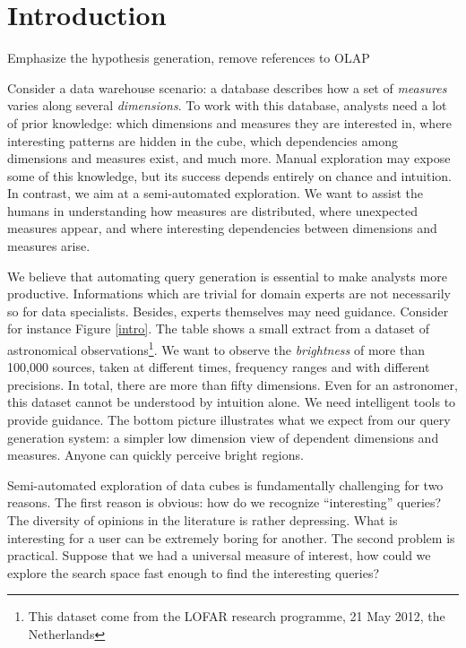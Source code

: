 \section{Introduction}
\label{sec:intro}

{ \color{red}
    Emphasize the hypothesis generation, remove references to OLAP}

Consider a data warehouse scenario: a database describes how a set of
\emph{measures} varies along several \emph{dimensions}. To work with this
database, analysts need a lot of prior knowledge: which dimensions and measures
they are interested in, where interesting patterns are hidden in the cube,
which dependencies among dimensions and measures exist, and much more.  Manual
exploration may expose some of this knowledge, but its success depends entirely
on chance and intuition. In contrast, we aim at a semi-automated exploration.
We want to assist the humans in understanding how measures are distributed,
where unexpected measures appear, and where interesting dependencies between
dimensions and measures arise.

We believe that automating query generation is essential to make analysts more
productive. Informations which are trivial for domain experts are not
necessarily so for data specialists. Besides, experts themselves may need
guidance. Consider for instance Figure \ref{intro}. The table shows a small
extract from a dataset of astronomical observations\footnote{This dataset come
from the LOFAR research programme, 21 May 2012, the Netherlands}. We want to
observe the \emph{brightness} of more than 100,000 sources, taken at different
times, frequency ranges and with different precisions. In total, there are more
than fifty dimensions. Even for an astronomer, this dataset cannot be
understood by intuition alone. We need intelligent tools to provide guidance.
The bottom picture illustrates what we expect from our query generation system:
a simpler low dimension view of dependent dimensions and measures.  Anyone can
quickly perceive bright regions.

Semi-automated exploration of data cubes is fundamentally challenging for two
reasons. The first reason is obvious: how do we recognize ``interesting''
queries?  The diversity of opinions in the literature is rather depressing.
What is interesting for a user can be extremely boring for another. The second
problem is practical.  Suppose that we had a universal measure of interest, how
could we explore the search space fast enough to find the interesting queries?


